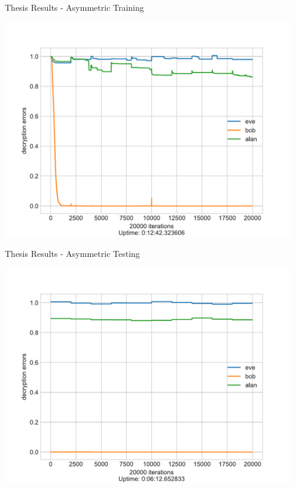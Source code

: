 \documentclass[a4paper, 12pt]{report}
\begin{document}
\begin{blockfigure}{Thesis Results - Asymmetric Training}
	\begin{center}
		\includegraphics[width = 0.95\textwidth]{neurencoder-asymmetric-training}
	\end{center}
\end{blockfigure}
\begin{blockfigure}{Thesis Results - Asymmetric Testing}
	\begin{center}
		\includegraphics[width = 0.95\textwidth]{neurencoder-asymmetric-testing}
	\end{center}
\end{blockfigure}
\newpage
\end{document}
